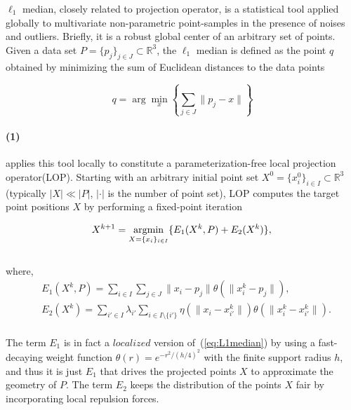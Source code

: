 $\ell_1$ median\cite{brown1983statistical,small1990survey}, closely related to projection operator, is a statistical tool applied globally to multivariate non-parametric point-samples in the presence of noises and outliers.
Briefly, it is a robust global center of an arbitrary set of points.
Given a data set $P=\{p_{j}\}_{j\in J}\subset \mathbb{R}^3$,
the $\ell_1$ median is defined as the point $q$ obtained by minimizing the sum of Euclidean distances to the data points

\small{
\begin{equation}
 \label{eq:L1median}
 q=\arg\min_{x}\left\{ \sum_{j\in J}^{}\|p_{j}-x\| \right\}
\end{equation}
}

\paragraph{(1)}

\cite{lipman2007parameterization} applies this tool locally to constitute a parameterization-free local projection operator(LOP).
Starting with an arbitrary initial point set $X^0=\{ x{_{i}^0}  \}_{i\in I}\subset \mathbb{R}^3$(typically $|X|\ll|P|$, $|\cdot|$ is the number of point set),
LOP computes the target point positions $X$ by performing a fixed-point iteration

\small{
\begin{equation}
 \label{eq:LOP1}
 X^{k+1}=\mathop{\operatorname*{argmin}}_{X=\{x_{i}\}_{i\in I}}\{E_1(X^{k},P)+E_2(X^{k})\},\\
\end{equation}
}
\\
where,
\small{
\begin{equation}
 \label{eq:LOP2}
 \begin{split}
 & E_1(X^{k},P)=\sum_{i\in I}^{}\sum_{j\in J}^{}\|x_{i}-p_{j}\|\theta(\|x{_i^k}-p_{j}\|),\\
 & E_2(X^{k})=\sum_{i'\in I}^{}\lambda_{i'}\sum_{i\in I\setminus\{i'\}}^{} \eta(\|x_{i}-x{_{i'}^k}\|)\theta(\|x{_i^k}-x{_{i'}^k}\|).
 \end{split}
\end{equation}
}
\\
The term $E_1$ is in fact a $localized$ version of~(\ref{eq:L1median}) by using a fast-decaying weight function $\theta(r)=e^{-r^2/(h/4)^2}$ with the finite support radius $h$,
and thus it is just $E_1$ that drives the projected points $X$ to approximate the geometry of $P$.
The term $E_2$ keeps the distribution of the points $X$ fair by incorporating local repulsion forces.

